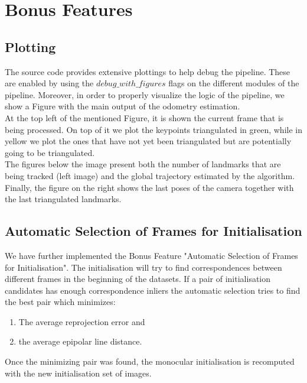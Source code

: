 \section{Bonus Features}
\label{s:BF}

\subsection{Plotting}
The source code provides extensive plottings to help debug the pipeline. These are enabled by using the $debug\_with\_figures$ flags
on the different modules of the pipeline. Moreover, in order to properly visualize the logic of the pipeline, we show a Figure 
with the main output of the odometry estimation. \\
At the top left of the mentioned Figure, it is shown the current frame that is being processed. On top of it we plot the keypoints
triangulated in green, while in yellow we plot the ones that have not yet been triangulated but are potentially going to be
triangulated. \\
The figures below the image present both the number of landmarks that are being tracked (left image) and the global trajectory
estimated by the algorithm. \\
Finally, the figure on the right shows the last poses of the camera together with the last triangulated landmarks.


\subsection{Automatic Selection of Frames for Initialisation}
We have further implemented the Bonus Feature "Automatic Selection of Frames for Initialisation". The initialisation will try to find correspondences between different frames in the beginning of the datasets. If a pair of initialisation candidates has enough correspondence inliers the automatic selection tries to find the best pair which minimizes:

\begin{enumerate}
\item The average reprojection error and 
\item the average epipolar line distance.
\end{enumerate}

Once the minimizing pair was found, the monocular initialisation is recomputed with the new initialisation set of images.

